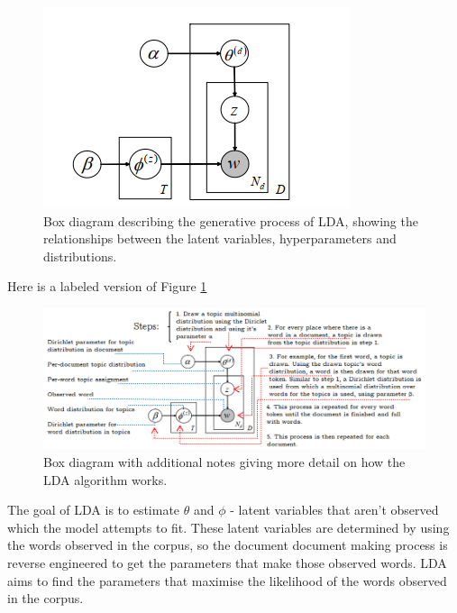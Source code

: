 \documentclass[
]{article}
\begin{document}
\begin{figure}

{\centering \includegraphics[width=1\linewidth]{images/Box diagram} 

}

\caption{Box diagram describing the generative process of LDA, showing the relationships between the latent variables, hyperparameters and distributions.}\label{fig:boxdia}
\end{figure}

Here is a labeled version of Figure \ref{fig:boxdia}

\begin{figure}

{\centering \includegraphics[width=1\linewidth]{images/plate dia lab} 

}

\caption{Box diagram with additional notes giving more detail on how the LDA algorithm works.}\label{fig:platedialab}
\end{figure}

The goal of LDA is to estimate \(\theta\) and \(\phi\) - latent
variables that aren't observed which the model attempts to fit. These
latent variables are determined by using the words observed in the
corpus, so the document document making process is reverse engineered to
get the parameters that make those observed words. LDA aims to find the
parameters that maximise the likelihood of the words observed in the
corpus.
\end{document}
